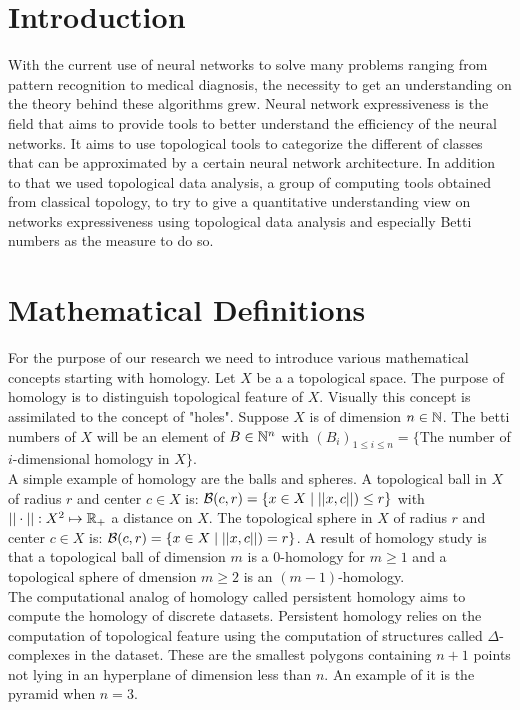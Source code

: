 \documentclass[12pt, a4paper]{article}
\begin{document}
\begin{multicols}{2}
  \section{Introduction}
With the current use of neural networks to solve many problems ranging from pattern recognition to medical diagnosis, the necessity to get an understanding on the theory behind these algorithms grew. Neural network expressiveness is the field that aims to provide tools to better understand the efficiency of the neural networks. It aims to use topological tools to categorize the different of classes that can be approximated by a certain neural network architecture. In addition to that we used topological data analysis, a group of computing tools obtained from classical topology, to try to give a quantitative understanding view on networks expressiveness using topological data analysis and especially Betti numbers as the measure to do so.

\section{Mathematical Definitions}

For the purpose of our research we need to introduce various mathematical concepts starting with homology.  Let $X$ be a a topological space. The purpose of homology is to distinguish topological feature of $X$. Visually this concept is assimilated to the concept of "holes". Suppose $X$ is of dimension $n \in \mathbb{N}$. The betti numbers of $X$ will be an element of $B \in \mathbb{N}^n$ with $(B_i)_{1 \le i \le n} = \{$The number of $i$-dimensional homology in $X \}$.\\

A simple example of homology are the balls and spheres. A topological ball in $X$ of radius $r$ and center $c \in X$ is: $\mathcal{B}(c,r) = \{x \in X \mid ||x,c||) \le r\}$ with $||\cdot|| : X^2 \mapsto \mathbb{R}_+$ a distance on $X$. The topological sphere in $X$ of radius $r$ and center $c \in X$ is: $\mathcal{B}(c,r) = \{x \in X \mid ||x,c||) = r\}$. A result of homology study is that a topological ball of dimension $m$ is a 0-homology for $m \ge 1$ and a topological sphere of dmension $m \ge 2$ is an $(m - 1)$-homology.\\

The computational analog of homology called persistent homology aims to compute the homology of discrete datasets. Persistent homology relies on the computation of topological feature using the computation of structures called $\Delta$-complexes in the dataset. These are the smallest polygons containing $n+1$ points not lying in an hyperplane of dimension less than $n$. An example of it is the pyramid when $n = 3$.\\


\end{multicols}
\end{document}
